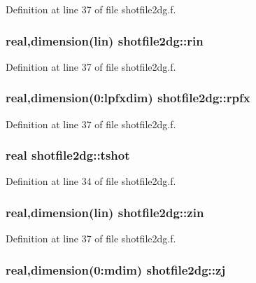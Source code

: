 Definition at line 37 of file shotfile2dg.f.\hypertarget{namespaceshotfile2dg_4c40d0bff2a50d6b8c210cb73852a429}{
\subsubsection[rin]{\setlength{\rightskip}{0pt plus 5cm}real,dimension({\bf lin}) {\bf shotfile2dg::rin}}}
\label{namespaceshotfile2dg_4c40d0bff2a50d6b8c210cb73852a429}




Definition at line 37 of file shotfile2dg.f.\hypertarget{namespaceshotfile2dg_462227f73e64d9a3ce1b6889907e3ac6}{
\subsubsection[rpfx]{\setlength{\rightskip}{0pt plus 5cm}real,dimension(0:{\bf lpfxdim}) {\bf shotfile2dg::rpfx}}}
\label{namespaceshotfile2dg_462227f73e64d9a3ce1b6889907e3ac6}




Definition at line 37 of file shotfile2dg.f.\hypertarget{namespaceshotfile2dg_c8db051db6516dbce57bfcf43cebcd46}{
\subsubsection[tshot]{\setlength{\rightskip}{0pt plus 5cm}real {\bf shotfile2dg::tshot}}}
\label{namespaceshotfile2dg_c8db051db6516dbce57bfcf43cebcd46}




Definition at line 34 of file shotfile2dg.f.\hypertarget{namespaceshotfile2dg_16cc50d1548b7d0f10879cf3fdc226c6}{
\subsubsection[zin]{\setlength{\rightskip}{0pt plus 5cm}real,dimension({\bf lin}) {\bf shotfile2dg::zin}}}
\label{namespaceshotfile2dg_16cc50d1548b7d0f10879cf3fdc226c6}




Definition at line 37 of file shotfile2dg.f.\hypertarget{namespaceshotfile2dg_99af9f1faabd9d89aecaf6bbb80e91ba}{
\subsubsection[zj]{\setlength{\rightskip}{0pt plus 5cm}real,dimension(0:{\bf mdim}) {\bf shotfile2dg::zj}}}
\label{namespaceshotfile2dg_99af9f1faabd9d89aecaf6bbb80e91ba}




